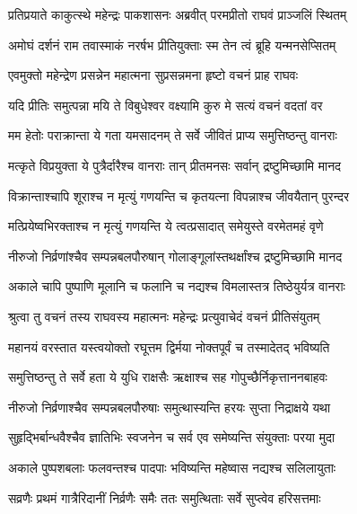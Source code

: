 
\twolineshloka
{प्रतिप्रयाते काकुत्स्थे महेन्द्रः पाकशासनः}
{अब्रवीत् परमप्रीतो राघवं प्राञ्जलिं स्थितम्} %

\twolineshloka
{अमोघं दर्शनं राम तवास्माकं नरर्षभ}
{प्रीतियुक्ताः स्म तेन त्वं ब्रूहि यन्मनसेप्सितम्} %

\twolineshloka
{एवमुक्तो महेन्द्रेण प्रसन्नेन महात्मना}
{सुप्रसन्नमना हृष्टो वचनं प्राह राघवः} %

\twolineshloka
{यदि प्रीतिः समुत्पन्ना मयि ते विबुधेश्वर}
{वक्ष्यामि कुरु मे सत्यं वचनं वदतां वर} %

\twolineshloka
{मम हेतोः पराक्रान्ता ये गता यमसादनम्}
{ते सर्वे जीवितं प्राप्य समुत्तिष्ठन्तु वानराः} %

\twolineshloka
{मत्कृते विप्रयुक्ता ये पुत्रैर्दारैश्च वानराः}
{तान् प्रीतमनसः सर्वान् द्रष्टुमिच्छामि मानद} %

\twolineshloka
{विक्रान्ताश्चापि शूराश्च न मृत्युं गणयन्ति च}
{कृतयत्ना विपन्नाश्च जीवयैतान् पुरन्दर} %

\twolineshloka
{मत्प्रियेष्वभिरक्ताश्च न मृत्युं गणयन्ति ये}
{त्वत्प्रसादात् समेयुस्ते वरमेतमहं वृणे} %

\twolineshloka
{नीरुजो निर्व्रणांश्चैव सम्पन्नबलपौरुषान्}
{गोलाङ्गूलांस्तथर्क्षांश्च द्रष्टुमिच्छामि मानद} %

\twolineshloka
{अकाले चापि पुष्पाणि मूलानि च फलानि च}
{नद्यश्च विमलास्तत्र तिष्ठेयुर्यत्र वानराः} %

\twolineshloka
{श्रुत्वा तु वचनं तस्य राघवस्य महात्मनः}
{महेन्द्रः प्रत्युवाचेदं वचनं प्रीतिसंयुतम्} %

\twolineshloka
{महानयं वरस्तात यस्त्वयोक्तो रघूत्तम}
{द्विर्मया नोक्तपूर्वं च तस्मादेतद् भविष्यति} %

\twolineshloka
{समुत्तिष्ठन्तु ते सर्वे हता ये युधि राक्षसैः}
{ऋक्षाश्च सह गोपुच्छैर्निकृत्ताननबाहवः} %

\twolineshloka
{नीरुजो निर्व्रणाश्चैव सम्पन्नबलपौरुषाः}
{समुत्थास्यन्ति हरयः सुप्ता निद्राक्षये यथा} %

\twolineshloka
{सुहृद्भिर्बान्धवैश्चैव ज्ञातिभिः स्वजनेन च}
{सर्व एव समेष्यन्ति संयुक्ताः परया मुदा} %

\twolineshloka
{अकाले पुष्पशबलाः फलवन्तश्च पादपाः}
{भविष्यन्ति महेष्वास नद्यश्च सलिलायुताः} %

\twolineshloka
{सव्रणैः प्रथमं गात्रैरिदानीं निर्व्रणैः समैः}
{ततः समुत्थिताः सर्वे सुप्त्वेव हरिसत्तमाः} %

